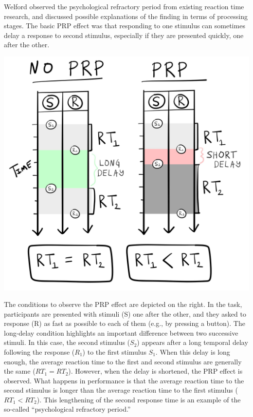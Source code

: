 \documentclass[
  oneside,
  12pt]{crumpbook}
\newenvironment{floatright50}{%
  \wrapfigure{R}{.5\textwidth}%
  }{%
  \endwrapfigure}
\begin{document}
Welford observed the psychological refractory period from existing reaction time research, and discussed possible explanations of the finding in terms of processing stages. The basic PRP effect was that responding to one stimulus can sometimes delay a response to second stimulus, especially if they are presented quickly, one after the other.

\begin{floatright50}
\includegraphics[width=1\linewidth]{imgs/PRP_effect}

\end{floatright50}

The conditions to observe the PRP effect are depicted on the right. In the task, participants are presented with stimuli (S) one after the other, and they asked to response (R) as fast as possible to each of them (e.g., by pressing a button). The long-delay condition highlights an important difference between two successive stimuli. In this case, the second stimulus (\(S_2\)) appears after a long temporal delay following the response (\(R_1\)) to the first stimulus \(S_1\). When this delay is long enough, the average reaction time to the first and second stimulus are generally the same (\(RT_1 = RT_2\)). However, when the delay is shortened, the PRP effect is observed. What happens in performance is that the average reaction time to the second stimulus is longer than the average reaction time to the first stimulus (\(RT_1 < RT_2\)). This lengthening of the second response time is an example of the so-called ``psychological refractory period.''
\end{document}

